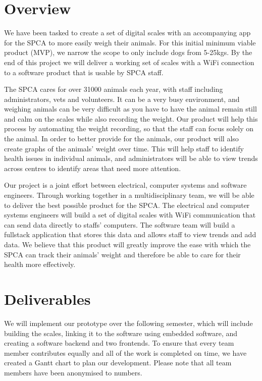 
\chapter{Overview}

We have been tasked to create a set of digital scales with an accompanying app for the SPCA to more easily weigh their animals. For this initial minimum viable product (MVP), we narrow the scope to only include dogs from 5-25kgs. By the end of this project we will deliver a working set of scales with a WiFi connection to a software product that is usable by SPCA staff. 

The SPCA cares for over 31000 animals each year, with staff including administrators, vets and volunteers. It can be a very busy environment, and weighing animals can be very difficult as you have to have the animal remain still and calm on the scales while also recording the weight. Our product will help this process by automating the weight recording, so that the staff can focus solely on the animal. In order to better provide for the animals, our product will also create graphs of the animals’ weight over time. This will help staff to identify health issues in individual animals, and administrators will be able to view trends across centres to identify areas that need more attention. 

Our project is a joint effort between electrical, computer systems and software engineers. Through working together in a multidisciplinary team, we will be able to deliver the best possible product for the SPCA. The electrical and computer systems engineers will build a set of digital scales with WiFi communication that can send data directly to staffs’ computers. The software team will build a fullstack application that stores this data and allows staff to view trends and add data. We believe that this product will greatly improve the ease with which the SPCA can track their animals’ weight and therefore be able to care for their health more effectively. 


\chapter{Deliverables}

We will implement our prototype over the following semester, which will include building the scales, linking it to the software using embedded software, and creating a software backend and two frontends. To ensure that every team member contributes equally and all of the work is completed on time, we have created a Gantt chart to plan our development.  Please note that all team members have been anonymised to numbers. 

